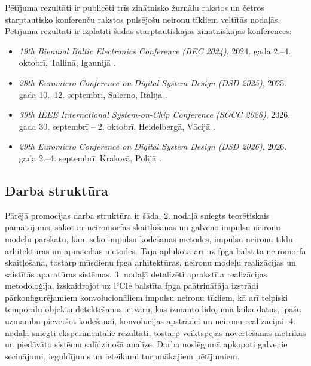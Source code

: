 Pētījuma rezultāti ir publicēti trīs zinātnisko žurnālu rakstos \cite{lielamurs2023b,novickis2024,lielamurs2025} un četros
starptautisko konferenču rakstos \cite{lielamurs2024,druml2025,lielamurs2026,druml2026} pulsējošu
neironu tīkliem veltītās nodaļās.
Pētījuma rezultāti ir izplatīti šādās starptautiskajās zinātniskajās konferencēs:
\begin{itemize}
    \item \textit{19th Biennial Baltic Electronics
    Conference (BEC 2024)},
    2024. gada 2.--4. oktobrī,
    Tallinā, Igaunijā \cite{lielamurs2024}.

    \item \textit{28th Euromicro Conference on
    Digital System Design (DSD 2025)},
    2025. gada 10.--12. septembrī,
    Salerno, Itālijā \cite{druml2025}.

    \item \textit{39th IEEE International
    System-on-Chip Conference (SOCC 2026)},
    2026. gada 30. septembrī -- 2. oktobrī,
    Heidelbergā, Vācijā \cite{lielamurs2026}.

    \item \textit{29th Euromicro Conference on
    Digital System Design (DSD 2026)},
    2026. gada 2.--4. septembrī,
    Krakovā, Polijā \cite{druml2026}.
\end{itemize}

\subsection{Darba struktūra}
Pārējā promocijas darba struktūra ir šāda. 2. nodaļā sniegts teorētiskais pamatojums, sākot ar neiromorfās skaitļošanas un
galveno impulsu neironu modeļu pārskatu, kam seko impulsu kodēšanas metodes, impulsu neironu tīklu arhitektūras un apmācības
metodes. Tajā aplūkota arī uz \Gls{fpga} balstīta neiromorfā skaitļošana, tostarp mūsdienu \Gls{fpga} arhitektūras, neironu
modeļu realizācijas un saistītās aparatūras sistēmas. 3. nodaļā detalizēti aprakstīta realizācijas metodoloģija, izskaidrojot uz
PCIe balstīta \Gls{fpga} paātrinātāja izstrādi pārkonfigurējamiem konvolucionāliem impulsu neironu tīkliem, kā arī telpiski
temporālu objektu detektēšanas ietvaru, kas izmanto lidojuma laika datus, īpašu uzmanību pievēršot kodēšanai, konvolūcijas
apstrādei un neironu realizācijai. 4. nodaļā sniegti eksperimentālie rezultāti, tostarp veiktspējas novērtēšanas metrikas un
piedāvāto sistēmu salīdzinošā analīze. Darba noslēgumā apkopoti galvenie secinājumi, ieguldījums un ieteikumi turpmākajiem
pētījumiem.


